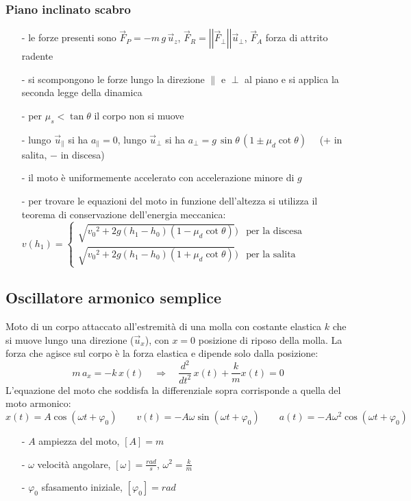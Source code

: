 \documentclass[a4paper]{article}
\newcommand\ux{\vec{u}_x}
\newcommand\uz{\vec{u}_z}
\newcommand\uper{\vec{u}_\perp}
\newcommand\upar{\vec{u}_\parallel}
\newcommand\dts{\frac{d^2}{dt^2}\,}
\newcommand\vmod[1]{\left|\left|{#1}\right|\right|}
\begin{document}
\subsubsection*{Piano inclinato scabro}
\begin{itemize}[topsep=3pt, itemsep=0pt]
	\item[-] le forze presenti sono \(\vec{F}_P = -m \, g \, \uz\), \(\vec{F}_R = \vmod{\vec{F}_\perp} \uper\), \(\vec{F}_A\) forza di attrito radente
	\item[-] si scompongono le forze lungo la direzione \(\parallel\) e \(\perp\) al piano e si applica la seconda legge della dinamica
	\item[-] per \(\mu_s < \tan \theta\) il corpo non si muove
	\item[-] lungo \(\upar\) si ha \(a_\parallel = 0\), lungo \(\uper\) si ha \(a_\perp = g \, \sin \theta \, (1 \pm \mu_d \cot \theta) \quad\) (+ in salita, \(-\) in discesa)
	\item[-] il moto è uniformemente accelerato con accelerazione minore di \(g\)
	\item[-] per trovare le equazioni del moto in funzione dell'altezza si utilizza il teorema di conservazione dell'energia meccanica:
	\(v(h_1) = \begin{cases}
		\sqrt{{v_0}^2 + 2g(h_1 - h_0)(1-\mu_d \cot \theta)}) &\text{per la discesa} \\
		\sqrt{{v_0}^2 + 2g(h_1 - h_0)(1+\mu_d \cot \theta)}) &\text{per la salita}
	\end{cases}\)
\end{itemize}

\newpage

\subsection{Oscillatore armonico semplice}
Moto di un corpo attaccato all'estremità di una molla con costante elastica \(k\) che si muove lungo una direzione (\(\ux\)),
con \(x=0\) posizione di riposo della molla. La forza che agisce sul corpo è la forza elastica e dipende solo dalla posizione:
\[m \, a_x = -k \, x(t) \quad \Rightarrow \quad \dts x(t) + \frac{k}{m} x(t) = 0\]
L'equazione del moto che soddisfa la differenziale sopra corrisponde a quella del moto armonico:
\[x(t) = A \cos (\omega t + \varphi_0) \qquad v(t) = -A \omega \sin (\omega t + \varphi_0) \qquad a(t) = -A \omega^2 \cos (\omega t + \varphi_0)\]
\begin{itemize}[topsep=3pt, itemsep=0pt]
	\item[-] \(A\) ampiezza del moto, \(\left[A\right] = m\)
	\item[-] \(\omega\) velocità angolare, \(\left[\omega\right] = \frac{rad}{s}\), \(\omega^2 = \frac{k}{m}\)
	\item[-] \(\varphi_0\) sfasamento iniziale, \(\left[\varphi_0\right] = rad\)
\end{itemize}
\end{document}
